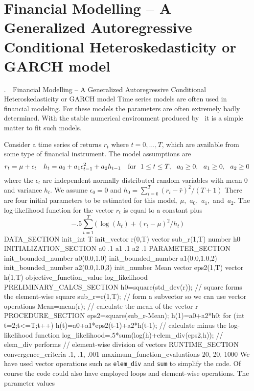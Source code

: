 \documentclass[12pt]{book}
\makeatletter
\def\mysection#1{\section{#1}{\bigbf \medbreak\noindent\number\c@chapter.\number\c@section\ \ #1\medbreak}}
\makeatother
\begin{document}
\htmlbeginignore
\def\pr{{\bf[P]}}
\def\HW{{Hilborn and Walters}}
\def\hw{{\bf[HW]}}
\htmlendignore

\htmlnewfile
\mysection{Financial Modelling -- A Generalized Autoregressive Conditional
\hbox{Heteroskedasticity} or GARCH model} 
Time series models are often used in financial
modeling. For these models the parameters are often extremely
badly determined. With the stable numerical environment
produced by \ADM\ it is a simple matter to fit
such models.

Consider a time series of returns $r_t$  where $t=0,\ldots,T$,
which are available from some type of financial instrument.
The model assumptions are
    $$ r_t = \mu + \epsilon_t\quad
        h_t = a_0 + a_1\epsilon_{t-1}^2 + a_2h_{t-1}\quad 
\hbox{\rm for }\ 1\le t\le T,\ \ a_0\ge 0,\ \ a_1\ge 0,\ \ a_2\ge 0$$
where the $\epsilon_t$ are independent normally distributed random variables
with mean 0 and variance $h_t$.
We assume $\epsilon_0=0$ and $h_0 = \sum_{i=0}^T(r_i-\bar r)^2/(T+1)$ 
There are four initial parameters to be estimated for this model, 
\hbox{$\mu$, $a_0$, $a_1$, and $a_2$}.
The log-likelihood function for the vector $r_t$ is equal 
to a constant plus
$$-.5\sum_{t=1}^T\big(\,\log(h_t)+(r_t-\mu)^2/h_t\,\big)$$
\beginexample
DATA_SECTION
  init_int T
  init_vector r(0,T)
  vector sub_r(1,T)
  number h0
INITIALIZATION_SECTION
  a0 .1
  a1 .1
  a2 .1
PARAMETER_SECTION
  init_bounded_number a0(0.0,1.0)
  init_bounded_number a1(0.0,1.0,2)
  init_bounded_number a2(0.0,1.0,3)
  init_number Mean
  vector eps2(1,T)
  vector h(1,T)
  objective_function_value log_likelihood
PRELIMINARY_CALCS_SECTION
  h0=square(std_dev(r));   // square forms the element-wise square 
  sub_r=r(1,T);    // form a subvector so we can use vector operations
  Mean=mean(r);    // calculate the mean of the vector r 
PROCEDURE_SECTION
  eps2=square(sub_r-Mean);   
  h(1)=a0+a2*h0;
  for (int t=2;t<=T;t++)
  {
    h(t)=a0+a1*eps2(t-1)+a2*h(t-1);
  }
  // calculate minus the log-likelihood function
  log_likelihood=.5*sum(log(h)+elem_div(eps2,h));  // elem_div performs  
                                // element-wise division of vectors
RUNTIME_SECTION
  convergence_criteria .1, .1, .001
  maximum_function_evaluations 20, 20, 1000
\endexample
{}
We have used vector operations such as {\tt elem\_div} and {\tt sum}
to simplify the code. Of course the code could also have employed
loops and element-wise operations. The parameter values
\end{document}
